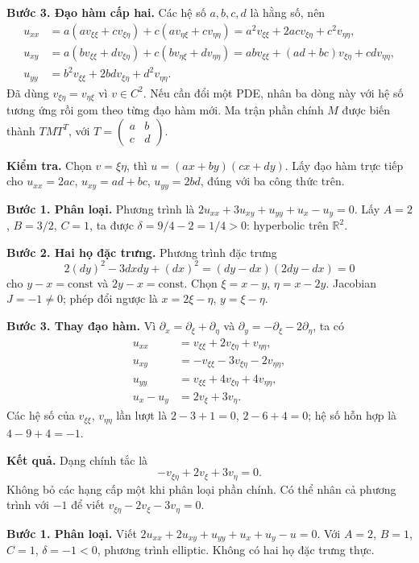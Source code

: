 \textbf{Bước 3. Đạo hàm cấp hai.} Các hệ số $a,b,c,d$ là hằng số, nên
\begin{align*}
u_{xx}&=a(av_{\xi\xi}+cv_{\xi\eta})+c(av_{\eta\xi}+cv_{\eta\eta})
=a^2v_{\xi\xi}+2acv_{\xi\eta}+c^2v_{\eta\eta},\\
u_{xy}&=a(bv_{\xi\xi}+dv_{\xi\eta})+c(bv_{\eta\xi}+dv_{\eta\eta})
=abv_{\xi\xi}+(ad+bc)v_{\xi\eta}+cdv_{\eta\eta},\\
u_{yy}&=b^2v_{\xi\xi}+2bdv_{\xi\eta}+d^2v_{\eta\eta}.
\end{align*}
Đã dùng $v_{\xi\eta}=v_{\eta\xi}$ vì $v\in C^2$. Nếu cần đổi một PDE, nhân ba dòng này với hệ số tương ứng rồi gom theo từng đạo hàm mới. Ma trận phần chính $M$ được biến thành $TMT^T$, với $T=\left(\begin{smallmatrix}a&b\\c&d\end{smallmatrix}\right)$.

\textbf{Kiểm tra.} Chọn $v=\xi\eta$, thì $u=(ax+by)(cx+dy)$. Lấy đạo hàm trực tiếp cho $u_{xx}=2ac$, $u_{xy}=ad+bc$, $u_{yy}=2bd$, đúng với ba công thức trên.

\textbf{Bước 1. Phân loại.} Phương trình là $2u_{xx}+3u_{xy}+u_{yy}+u_x-u_y=0$. Lấy $A=2$, $B=3/2$, $C=1$, ta được $\delta=9/4-2=1/4>0$: hyperbolic trên $\mathbb R^2$.

\textbf{Bước 2. Hai họ đặc trưng.} Phương trình đặc trưng
\[2(dy)^2-3dxdy+(dx)^2=(dy-dx)(2dy-dx)=0\]
cho $y-x=\mathrm{const}$ và $2y-x=\mathrm{const}$. Chọn $\xi=x-y$, $\eta=x-2y$. Jacobian $J=-1\ne0$; phép đổi ngược là $x=2\xi-\eta$, $y=\xi-\eta$.

\textbf{Bước 3. Thay đạo hàm.} Vì $\partial_x=\partial_\xi+\partial_\eta$ và $\partial_y=-\partial_\xi-2\partial_\eta$, ta có
\begin{align*}
u_{xx}&=v_{\xi\xi}+2v_{\xi\eta}+v_{\eta\eta},\\
u_{xy}&=-v_{\xi\xi}-3v_{\xi\eta}-2v_{\eta\eta},\\
u_{yy}&=v_{\xi\xi}+4v_{\xi\eta}+4v_{\eta\eta},\\
u_x-u_y&=2v_\xi+3v_\eta.
\end{align*}
Các hệ số của $v_{\xi\xi}$, $v_{\eta\eta}$ lần lượt là $2-3+1=0$, $2-6+4=0$; hệ số hỗn hợp là $4-9+4=-1$.

\textbf{Kết quả.} Dạng chính tắc là
\[\boxed{-v_{\xi\eta}+2v_\xi+3v_\eta=0.}\]
Không bỏ các hạng cấp một khi phân loại phần chính. Có thể nhân cả phương trình với $-1$ để viết $v_{\xi\eta}-2v_\xi-3v_\eta=0$.

\textbf{Bước 1. Phân loại.} Viết $2u_{xx}+2u_{xy}+u_{yy}+u_x+u_y-u=0$. Với $A=2$, $B=1$, $C=1$, $\delta=-1<0$, phương trình elliptic. Không có hai họ đặc trưng thực.

